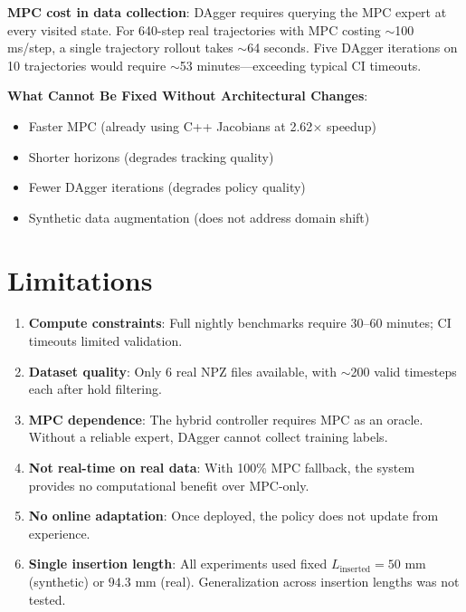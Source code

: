 \documentclass[conference]{IEEEtran}
\begin{document}
\textbf{MPC cost in data collection}: DAgger requires querying the MPC expert at every visited state. For 640-step real trajectories with MPC costing $\sim$100 ms/step, a single trajectory rollout takes $\sim$64 seconds. Five DAgger iterations on 10 trajectories would require $\sim$53 minutes---exceeding typical CI timeouts.

\textbf{What Cannot Be Fixed Without Architectural Changes}:
\begin{itemize}
\item Faster MPC (already using C++ Jacobians at 2.62$\times$ speedup)
\item Shorter horizons (degrades tracking quality)
\item Fewer DAgger iterations (degrades policy quality)
\item Synthetic data augmentation (does not address domain shift)
\end{itemize}

\section{Limitations}

\begin{enumerate}
\item \textbf{Compute constraints}: Full nightly benchmarks require 30--60 minutes; CI timeouts limited validation.

\item \textbf{Dataset quality}: Only 6 real NPZ files available, with $\sim$200 valid timesteps each after hold filtering.

\item \textbf{MPC dependence}: The hybrid controller requires MPC as an oracle. Without a reliable expert, DAgger cannot collect training labels.

\item \textbf{Not real-time on real data}: With 100\% MPC fallback, the system provides no computational benefit over MPC-only.

\item \textbf{No online adaptation}: Once deployed, the policy does not update from experience.

\item \textbf{Single insertion length}: All experiments used fixed $L_{\text{inserted}} = 50$ mm (synthetic) or $94.3$ mm (real). Generalization across insertion lengths was not tested.
\end{enumerate}
\end{document}
